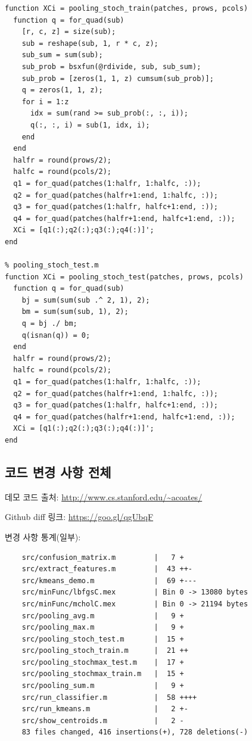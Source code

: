 \documentclass[a4paper,9pt,hidelinks]{article}
\begin{document}
\begin{lstlisting}[basicstyle=\small]
% pooling_stoch_train.m
function XCi = pooling_stoch_train(patches, prows, pcols)
  function q = for_quad(sub)
    [r, c, z] = size(sub);
    sub = reshape(sub, 1, r * c, z);
    sub_sum = sum(sub);
    sub_prob = bsxfun(@rdivide, sub, sub_sum);
    sub_prob = [zeros(1, 1, z) cumsum(sub_prob)];
    q = zeros(1, 1, z);
    for i = 1:z
      idx = sum(rand >= sub_prob(:, :, i));
      q(:, :, i) = sub(1, idx, i);
    end
  end
  halfr = round(prows/2);
  halfc = round(pcols/2);
  q1 = for_quad(patches(1:halfr, 1:halfc, :));
  q2 = for_quad(patches(halfr+1:end, 1:halfc, :));
  q3 = for_quad(patches(1:halfr, halfc+1:end, :));
  q4 = for_quad(patches(halfr+1:end, halfc+1:end, :));
  XCi = [q1(:);q2(:);q3(:);q4(:)]';
end

% pooling_stoch_test.m
function XCi = pooling_stoch_test(patches, prows, pcols)
  function q = for_quad(sub)
    bj = sum(sum(sub .^ 2, 1), 2);
    bm = sum(sum(sub, 1), 2);
    q = bj ./ bm;
    q(isnan(q)) = 0;
  end
  halfr = round(prows/2);
  halfc = round(pcols/2);
  q1 = for_quad(patches(1:halfr, 1:halfc, :));
  q2 = for_quad(patches(halfr+1:end, 1:halfc, :));
  q3 = for_quad(patches(1:halfr, halfc+1:end, :));
  q4 = for_quad(patches(halfr+1:end, halfc+1:end, :));
  XCi = [q1(:);q2(:);q3(:);q4(:)]';
end
\end{lstlisting}

\subsection*{코드 변경 사항 전체}

데모 코드 출처: \url{http://www.cs.stanford.edu/~acoates/}

Github diff 링크: \url{https://goo.gl/qgUbqF}

변경 사항 통계(일부):
\begin{lstlisting}
    src/confusion_matrix.m         |   7 +
    src/extract_features.m         |  43 ++-
    src/kmeans_demo.m              |  69 +---
    src/minFunc/lbfgsC.mex         | Bin 0 -> 13080 bytes
    src/minFunc/mcholC.mex         | Bin 0 -> 21194 bytes
    src/pooling_avg.m              |   9 +
    src/pooling_max.m              |   9 +
    src/pooling_stoch_test.m       |  15 +
    src/pooling_stoch_train.m      |  21 ++
    src/pooling_stochmax_test.m    |  17 +
    src/pooling_stochmax_train.m   |  15 +
    src/pooling_sum.m              |   9 +
    src/run_classifier.m           |  58 ++++
    src/run_kmeans.m               |   2 +-
    src/show_centroids.m           |   2 -
    83 files changed, 416 insertions(+), 728 deletions(-)
\end{lstlisting}
\end{document}
